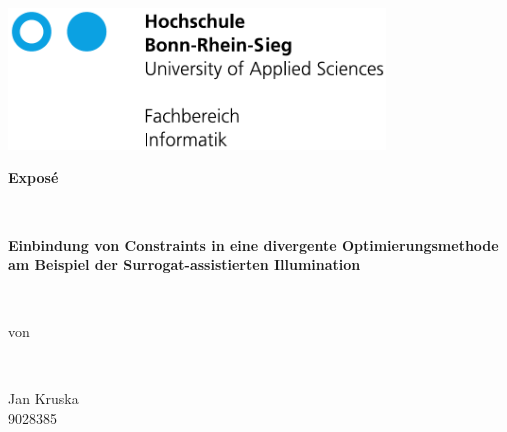 \documentclass[12pt]{article}
\begin{document}

\begin{titlepage}


  \begin{minipage}[t]{10cm}
  \includegraphics[width=10cm]{h-logo-full-font-embed}\\
  \end{minipage}
  \vspace{2.5cm}

	\begin{center}

    \vspace{0.8cm}

    \vspace{3cm}
    \begin{Huge}
    \textbf{Exposé}\end{Huge}\\
    \vspace{0.8cm}
  	\begin{huge}
  	\textbf{Einbindung von Constraints in eine divergente Optimierungsmethode am Beispiel der Surrogat-assistierten Illumination}
  	\end{huge}
  	 \vspace{0.6cm} \\
  	  	  \begin{large}von
  	  \end{large}
  	  \\ \begin{LARGE}
  	   \vspace{0.6cm}
  	  {Jan Kruska}\\
  	  9028385\\
  	  \vspace{0.8cm}
  	 
  	\end{LARGE}
  	
    \vspace{3.0cm}
			\end{center}
	\begin{large}


\end{large}
\end{titlepage}
\end{document}

